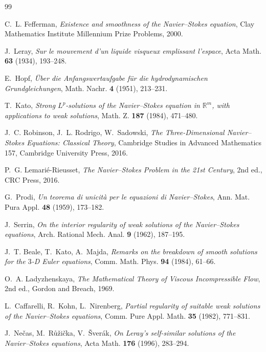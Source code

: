 \documentclass[11pt]{article}
\theoremstyle{remark}
\newcommand{\R}{\mathbb{R}}
\begin{document}
\begin{thebibliography}{99}

C.~L. Fefferman,
\emph{Existence and smoothness of the Navier--Stokes equation},
Clay Mathematics Institute Millennium Prize Problems, 2000.

J.~Leray,
\emph{Sur le mouvement d'un liquide visqueux emplissant l'espace},
Acta Math. \textbf{63} (1934), 193--248.

E.~Hopf,
\emph{\"Uber die Anfangswertaufgabe f\"ur die hydrodynamischen Grundgleichungen},
Math. Nachr. \textbf{4} (1951), 213--231.

T.~Kato,
\emph{Strong $L^p$-solutions of the Navier--Stokes equation in $\R^m$, with applications to
weak solutions},
Math. Z. \textbf{187} (1984), 471--480.

J.~C. Robinson, J.~L. Rodrigo, W.~Sadowski,
\emph{The Three-Dimensional Navier--Stokes Equations: Classical Theory},
Cambridge Studies in Advanced Mathematics 157, Cambridge University Press, 2016.

P.~G. Lemari\'e-Rieusset,
\emph{The Navier--Stokes Problem in the 21st Century}, 2nd ed.,
CRC Press, 2016.

G.~Prodi,
\emph{Un teorema di unicit\`a per le equazioni di Navier--Stokes},
Ann. Mat. Pura Appl. \textbf{48} (1959), 173--182.

J.~Serrin,
\emph{On the interior regularity of weak solutions of the Navier--Stokes equations},
Arch. Rational Mech. Anal. \textbf{9} (1962), 187--195.

J.~T. Beale, T.~Kato, A.~Majda,
\emph{Remarks on the breakdown of smooth solutions for the $3$-D Euler equations},
Comm. Math. Phys. \textbf{94} (1984), 61--66.

O.~A. Ladyzhenskaya,
\emph{The Mathematical Theory of Viscous Incompressible Flow}, 2nd ed.,
Gordon and Breach, 1969.

L.~Caffarelli, R.~Kohn, L.~Nirenberg,
\emph{Partial regularity of suitable weak solutions of the Navier--Stokes equations},
Comm. Pure Appl. Math. \textbf{35} (1982), 771--831.

J.~Ne\v{c}as, M.~R\r{u}\v{z}i\v{c}ka, V.~\v{S}ver\'ak,
\emph{On Leray's self-similar solutions of the Navier--Stokes equations},
Acta Math. \textbf{176} (1996), 283--294.


\end{thebibliography}
\end{document}

